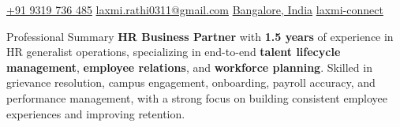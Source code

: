 \documentclass[hidelinks]{resume}
\begin{document}
\centerline{\small
    \textcolor{primary}{\href{tel:+919319736485}{ +91 9319 736 485}}
    \quad \textcolor{primary}{\href{mailto:laxmi.rathi0311@gmail.com}{ laxmi.rathi0311@gmail.com}}
    \quad \textcolor{primary}{\href{https://www.google.com/maps/place/Bangalore,+Karnataka}{ Bangalore, India}}
    \quad \textcolor{primary}{\href{http://www.linkedin.com/in/laxmi-connect}{ laxmi-connect}}
}

\begin{rSection}{Professional Summary}
    \textcolor{neutral}{\textbf{HR Business Partner}} with \textcolor{primary}{\textbf{1.5 years}} of experience in HR generalist operations, specializing in end-to-end \textcolor{primary}{\textbf{talent lifecycle management}}, \textcolor{primary}{\textbf{employee relations}}, and \textcolor{primary}{\textbf{workforce planning}}. Skilled in grievance resolution, campus engagement, onboarding, payroll accuracy, and performance management, with a strong focus on building consistent employee experiences and improving retention.
\end{rSection}
\end{document}
